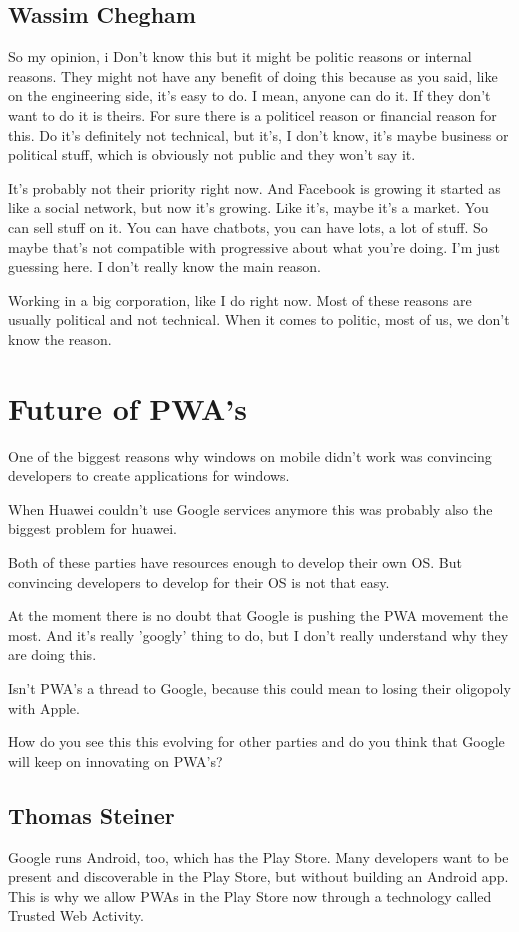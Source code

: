 		\subsection{Wassim Chegham}
			So my opinion, i Don't know this but it might be politic reasons or internal reasons. They might not have any benefit of doing this because as you said, like on the engineering side, it's easy to do. I mean, anyone can do it. If they don't want to do it is theirs. For sure there is a politicel reason or financial reason for this. Do it's definitely not technical, but it's, I don't know, it's maybe business or political stuff, which is obviously not public and they won't say it. 
			
			
			It's probably not their priority right now. And Facebook is growing it started as like a social network, but now it's growing. Like it's, maybe it's a market. You can sell stuff on it. You can have chatbots, you can have lots, a lot of stuff. So maybe that's not compatible with progressive about what you're doing. I'm just guessing here. I don't really know the main reason. 
			
			Working in a big corporation, like I do right now. Most of these reasons are usually political and not technical. When it comes to politic, most of us, we don't know the reason.
		
	
	\section{Future of PWA's }
		One of the biggest reasons why windows on mobile didn't work was convincing developers to create applications for windows. 
		
		When Huawei couldn't use Google services anymore this was probably also the biggest problem for huawei.
		
		Both of these parties have resources enough to develop their own OS. But convincing developers to develop for their OS is not that easy.
		
		At the moment there is no doubt that Google is pushing the PWA movement the most. And it's really 'googly' thing to do, but I don't really understand why they are doing this.
		
		Isn't PWA's a thread to Google, because this could mean to losing their oligopoly with Apple.
		
		How do you see this this evolving for other parties and do you think that Google will keep on innovating on PWA's?
		
		\subsection{Thomas Steiner}
			Google runs Android, too, which has the Play Store. Many developers want to be present and discoverable in the Play Store, but without building an Android app. This is why we allow PWAs in the Play Store now through a technology called Trusted Web Activity. 
			
